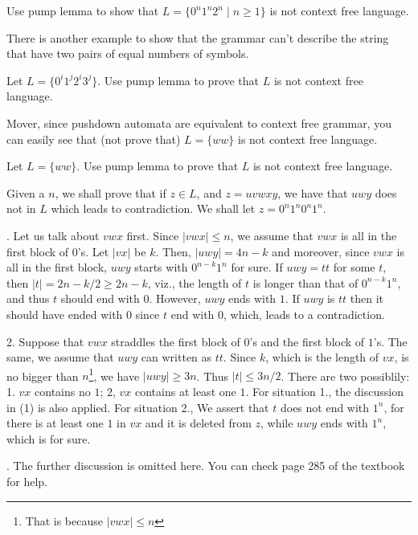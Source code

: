 \begin{exam}
	Use pump lemma to show that \(L = \{ 0 ^{n} 1 ^{n} 2 ^{n} \mid n \ge 1 \}\) is not context free language.
\end{exam}
There is another example to show that the grammar can't describe the string that have two pairs of equal numbers of symbols. 
\begin{exam}
	Let \(L = \{ 0 ^{i} 1 ^{j} 2 ^{i} 3 ^{j} \}\). Use pump lemma to prove that \(L\) is not context free language. 
\end{exam}
Mover, since pushdown automata are equivalent to context free grammar, you can easily see that (not prove that) 
\(L =  \{ ww\}\) is not context  free language. 
\begin{exam}
	Let \(L = \{ ww \}\). Use pump lemma to prove that \(L\) is not context free language.

	Given a \(n\), we shall prove that if \(z \in L\), and \(z  =  uv w xy\), we have that \( u w y\) does not in \(L\) which leads to
	contradiction.  We shall let \(z =  0 ^{n} 1 ^{n} 0 ^{n} 1 ^{n}\). 

	\setlength{\hangindent}{33pt} 
	. Let us talk about \( v w x \) first. Since \( |v w x | \le n\), we assume that \(v w x \) is all in the first 
	block of \(0\)'s. Let \( |v x |\) be \(k\). Then, \( |  u w y | = 4n - k\) and moreover, since \(v w x\) is all 
	in the first block, \( u w y \) starts with \( 0 ^{n - k} 1 ^{n}\) for sure. If \( u w  y = tt\) for some \(t\),
	then \( |t| = 2n - k/2 \ge 2n - k\), viz., the length of \(t\) is longer than that of \( 0 ^{n - k} 1 ^{n}\), and 
	thus \(t\) should end with \(0\). However, \( uwy \) ends with \(1\). If \( u wy\) is \(tt\) then it should have ended 
	with \(0\) since \(t\) end with \(0\), which, leads to a contradiction.
	\medskip

	2. Suppose that \( v w x\) straddles the first block of \(0\)'s and the first block of \(1\)'s.	
	The same, we assume that \( u w y\) can written as \(tt\). Since \(k\), which is the length of 
	\(v x\), is no bigger than \(n\)\footnote{That is because \(|v w x| \le n\)}, we have \( |uwy| \ge 3n\).
	Thus \( |t | \le 3n / 2\). There are two possiblily: 1. \( v x \) contains no \(1\); 2, \(v x\) contains 
	at least one \(1\). For situation 1., the discussion in (1) is also applied. For situation 2., We assert 
	that \(t\) does not end with \(1 ^{n}\), for there is at least one \(1\) in \(v x\) and it is deleted from 
	\(z\), while \( uw y\) ends with \(1^{n}\), which is for sure.

	. The further discussion is omitted here.  You can check page 285 of the textbook for help.
\end{exam}
